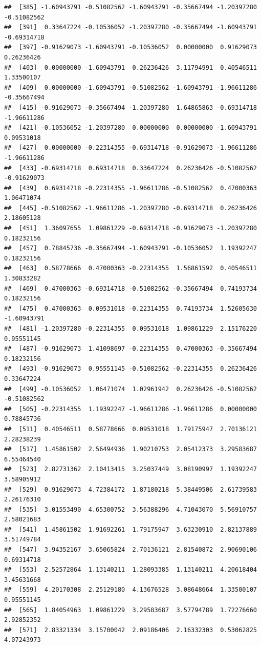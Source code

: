 \documentclass[
]{article}
\begin{document}
\begin{verbatim}
##  [385] -1.60943791 -0.51082562 -1.60943791 -0.35667494 -1.20397280 -0.51082562
##  [391]  0.33647224 -0.10536052 -1.20397280 -0.35667494 -1.60943791 -0.69314718
##  [397] -0.91629073 -1.60943791 -0.10536052  0.00000000  0.91629073  0.26236426
##  [403]  0.00000000 -1.60943791  0.26236426  3.11794991  0.40546511  1.33500107
##  [409]  0.00000000 -1.60943791 -0.51082562 -1.60943791 -1.96611286 -0.35667494
##  [415] -0.91629073 -0.35667494 -1.20397280  1.64865863 -0.69314718 -1.96611286
##  [421] -0.10536052 -1.20397280  0.00000000  0.00000000 -1.60943791  0.09531018
##  [427]  0.00000000 -0.22314355 -0.69314718 -0.91629073 -1.96611286 -1.96611286
##  [433] -0.69314718  0.69314718  0.33647224  0.26236426 -0.51082562 -0.91629073
##  [439]  0.69314718 -0.22314355 -1.96611286 -0.51082562  0.47000363  1.06471074
##  [445] -0.51082562 -1.96611286 -1.20397280 -0.69314718  0.26236426  2.18605128
##  [451]  1.36097655  1.09861229 -0.69314718 -0.91629073 -1.20397280  0.18232156
##  [457]  0.78845736 -0.35667494 -1.60943791 -0.10536052  1.19392247  0.18232156
##  [463]  0.58778666  0.47000363 -0.22314355  1.56861592  0.40546511  1.30833282
##  [469]  0.47000363 -0.69314718 -0.51082562 -0.35667494  0.74193734  0.18232156
##  [475]  0.47000363  0.09531018 -0.22314355  0.74193734  1.52605630 -1.60943791
##  [481] -1.20397280 -0.22314355  0.09531018  1.09861229  2.15176220  0.95551145
##  [487] -0.91629073  1.41098697 -0.22314355  0.47000363 -0.35667494  0.18232156
##  [493] -0.91629073  0.95551145 -0.51082562 -0.22314355  0.26236426  0.33647224
##  [499] -0.10536052  1.06471074  1.02961942  0.26236426 -0.51082562 -0.51082562
##  [505] -0.22314355  1.19392247 -1.96611286 -1.96611286  0.00000000  0.78845736
##  [511]  0.40546511  0.58778666  0.09531018  1.79175947  2.70136121  2.28238239
##  [517]  1.45861502  2.56494936  1.90210753  2.05412373  3.29583687  6.55464540
##  [523]  2.82731362  2.10413415  3.25037449  3.08190997  1.19392247  3.58905912
##  [529]  0.91629073  4.72384172  1.87180218  5.38449506  2.61739583  2.26176310
##  [535]  3.01553490  4.65300752  3.56388296  4.71043070  5.56910757  2.58021683
##  [541]  1.45861502  1.91692261  1.79175947  3.63230910  2.82137889  3.51749784
##  [547]  3.94352167  3.65065824  2.70136121  2.81540872  2.90690106  0.69314718
##  [553]  2.52572864  1.13140211  1.28093385  1.13140211  4.20618404  3.45631668
##  [559]  4.20170308  2.25129180  4.13676528  3.08648664  1.33500107  0.95551145
##  [565]  1.84054963  1.09861229  3.29583687  3.57794789  1.72276660  2.92852352
##  [571]  2.83321334  3.15700042  2.09186406  2.16332303  0.53062825  4.07243973

\end{verbatim}
\end{document}
